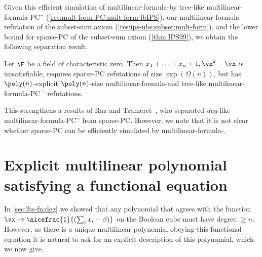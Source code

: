 \documentclass[11pt]{article}
\numberwithin{equation}{section}
\theoremstyle{definition}
\theoremstyle{plain}
\begin{document}
Given this efficient simulation of multilinear-formula-\lbIPS by tree-like multilinear-formula-PC$^\neg$ (\autoref{res:mult-form-PC:mult-form-lbIPS}), our multilinear-formula-\lIPS refutation of the subset-sum axiom (\autoref{res:ips-ubs:subset:mult-form}), and the lower bound for sparse-PC of the subset-sum axiom (\autoref{thm:IPS99}), we obtain the following separation result.

\begin{corollarywp}
        Let $\F$ be a field of characteristic zero. Then $x_1+\cdots+x_n+1,\vx^2-\vx$ is unsatisfiable, requires sparse-PC refutations of
%
size $\exp(\Omega(n))$,    %
but has $\poly(n)$-explicit $\poly(n)$-size multilinear-formula-\lIPS and tree-like multilinear-formula-PC$\,^\neg$ refutations.
\end{corollarywp}

This strengthens a results of Raz and Tzameret~\cite{RazTzameret08a,RazTzameret08b}, who separated \emph{dag}-like multilinear-formula-PC$^\neg$ from sparse-PC\@. However, we note that it is not clear whether sparse-PC can be efficiently simulated by multilinear-formula-\lbIPS.

%
%


\section{Explicit multilinear polynomial satisfying a functional equation}\label{sec:appendix}

In \autoref{sec:lbs-fn:deg} we showed that any polynomial that agrees with the function $\vx\mapsto \nicefrac{1}{\left(\sum_i x_i-\beta\right)}$ on the Boolean cube must have degree $\ge n$.  However, as there is a unique multilinear polynomial obeying this functional equation it is natural to ask for an explicit description of this polynomial, which we now give.
\end{document}
